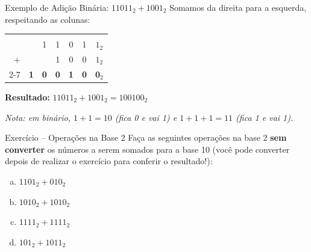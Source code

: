 \begin{frame}{Exemplo de Adição Binária: $11011_2 + 1001_2$}
    Somamos da direita para a esquerda, respeitando as colunas:

    \vspace{0.5cm}
    \centering
    \Large
    \begin{tabular}{r cccccc}
        \color{blue}{\footnotesize (vai um)} & \color{blue}{1} & \color{blue}{1} & \color{blue}{0} & \color{blue}{1} & \color{blue}{1} &                \\
                                             &                 & 1               & 1               & 0               & 1               & $1_2$          \\
        +                                    &                 &                 & 1               & 0               & 0               & $1_2$          \\ \cline{2-7}
                                             & \textbf{1}      & \textbf{0}      & \textbf{0}      & \textbf{1}      & \textbf{0}      & \textbf{0}$_2$ \\
    \end{tabular}

    \vspace{0.8cm}
    \flushleft
    \normalsize
    \textbf{Resultado:} $11011_2 + 1001_2 = 100100_2$

    \vspace{0.3cm}
    \small
    \textit{Nota: em binário, $1+1=10$ (fica 0 e vai 1) e $1+1+1=11$ (fica 1 e vai 1).}
\end{frame}

\begin{frame}{Exercício -- Operações na Base 2}
    Faça as seguintes operações na base 2 \textbf{sem converter} os números a serem somados para a base 10 (você pode converter depois de realizar o exercício para conferir o resultado!):

    \begin{enumerate}[a)]
        \item $1101_2 + 010_2$
        \item $1010_2 + 1010_2$
        \item $1111_2 + 1111_2$
        \item $101_2 + 1011_2$
    \end{enumerate}



\end{frame}


